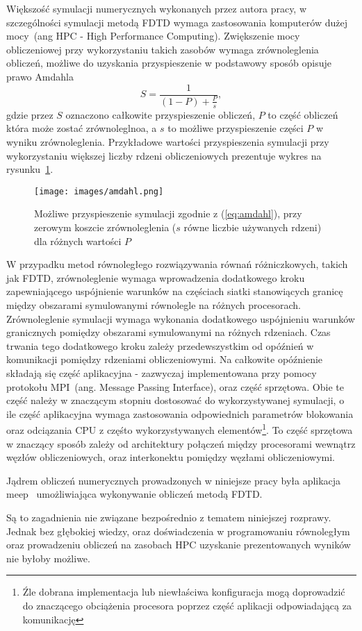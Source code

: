 
Większość symulacji numerycznych wykonanych przez autora pracy, w szczególności symulacji metodą FDTD wymaga zastosowania komputerów dużej mocy~(ang HPC - High Performance Computing). Zwiększenie mocy obliczeniowej przy wykorzystaniu takich zasobów wymaga zrównoleglenia obliczeń, możliwe do uzyskania przyspieszenie w podstawowy sposób opisuje prawo Amdahla
\begin{equation}
	S=\frac{1}{(1-P)+\frac{P}{s}},
	\label{eq:amdahl}
\end{equation}
gdzie przez $S$ oznaczono całkowite przyspieszenie obliczeń, $P$ to część obliczeń która może zostać zrównoleglnoa, a $s$ to możliwe przyspieszenie części $P$ w wyniku zrównoleglenia. Przykładowe wartości przyspieszenia symulacji przy wykorzystaniu większej liczby rdzeni obliczeniowych prezentuje wykres na rysunku~\ref{fig:amdhal}.

\begin{figure}[h]
	\texttt{[image: images/amdahl.png]}
	\caption{Możliwe przyspieszenie symulacji zgodnie z (\ref{eq:amdahl}), przy zerowym koszcie zrównoleglenia ($s$ równe liczbie używanych rdzeni) dla różnych wartości $P$~\cite{wiki:amdhal}}
	\label{fig:amdhal}
\end{figure}

W przypadku metod równoległego rozwiązywania równań różniczkowych, takich jak FDTD, zrównoleglenie wymaga wprowadzenia dodatkowego kroku zapewniającego uspójnienie warunków na częściach siatki stanowiących granicę między obszarami symulowanymi równolegle na różnych procesorach. Zrównoleglenie symulacji wymaga wykonania dodatkowego uspójnieniu warunków granicznych pomiędzy obszarami symulowanymi na różnych rdzeniach. Czas trwania tego dodatkowego kroku zależy przedewszystkim od opóźnień w komunikacji pomiędzy rdzeniami obliczeniowymi. Na całkowite opóźnienie składają się część aplikacyjna - zazwyczaj implementowana przy pomocy protokołu MPI~(ang. Message Passing Interface), oraz część sprzętowa. Obie te część należy w znaczącym stopniu dostosować do wykorzystywanej symulacji, o ile część aplikacyjna wymaga zastosowania odpowiednich parametrów blokowania oraz odciązania CPU z częśto wykorzystywanych elementów\footnote{Źle dobrana implementacja lub niewłaściwa konfiguracja mogą doprowadzić do znaczącego obciążenia procesora poprzez część aplikacji odpowiadającą za komunikację}. To część sprzętowa w znaczący sposób zależy od architektury połączeń między procesorami wewnątrz węzłów obliczeniowych, oraz interkonektu pomiędzy węzłami obliczeniowymi. 

Jądrem obliczeń numerycznych prowadzonych w niniejsze pracy była aplikacja meep~\cite{OskooiRo10} umożliwiająca wykonywanie obliczeń metodą FDTD.

Są to zagadnienia nie związane bezpośrednio z tematem niniejszej rozprawy. Jednak bez głębokiej wiedzy, oraz doświadczenia w programowaniu równoległym oraz prowadzeniu obliczeń na zasobach HPC uzyskanie prezentowanych wyników nie byłoby możliwe.
